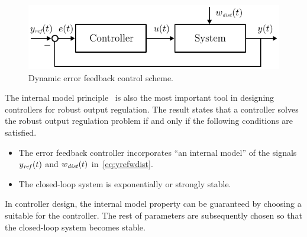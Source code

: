 \documentclass[11pt, a4paper]{amsart}
\theoremstyle{definition}
\numberwithin{equation}{section}
\newcommand{\yref}{y_{\mbox{\scriptsize\textit{ref}}}}
\newcommand{\wdist}{w_{\mbox{\scriptsize\textit{dist}}}}
\begin{document}
\vspace{-.3cm}

\begin{figure}[h!]
  \begin{center}
    \includegraphics[width=.75\linewidth]{FB-control-scheme-horizontal-slim-notation} 
    \caption{Dynamic error feedback control scheme.}
    \label{fig:FBcontrol}
  \end{center}
\end{figure}

\vspace{-.3cm}

The internal model principle~\cite[Thm. 6.9]{PauPoh10} is also the most important tool in designing controllers for robust output regulation. The result states that a controller solves the robust output regulation problem if and only if the following conditions are satisfied.
\begin{itemize}
  \item The error feedback controller incorporates ``an internal model'' of
    the signals $\yref(t)$ and $\wdist(t)$ in~\eqref{eq:yrefwdist}.
  \item The closed-loop system is exponentially or strongly stable.
\end{itemize}
In controller design, the internal model property can be guaranteed by choosing a suitable  for the controller. The rest of parameters are subsequently chosen so that the closed-loop system becomes stable.
\end{document}
